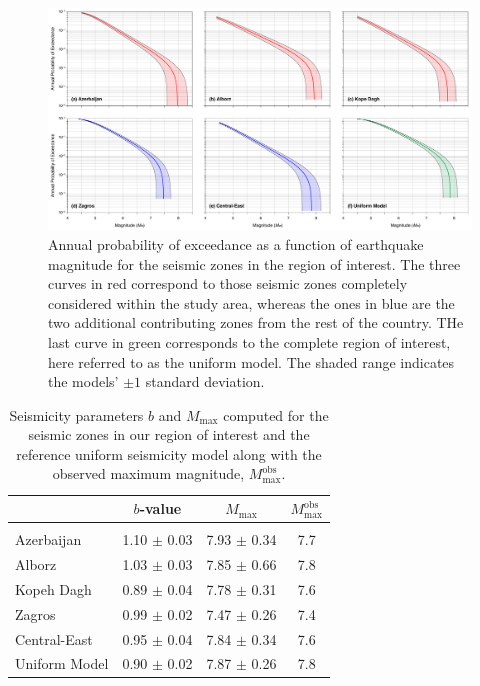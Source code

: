 
\begin{figure}[t]
    \centering
    \includegraphics[width=\textwidth]{figures/pdf/figure-06} 
    \caption{Annual probability of exceedance as a function of earthquake magnitude for the seismic zones in the region of interest. The three curves in red correspond to those seismic zones completely considered within the study area, whereas the ones in blue are the two additional contributing zones from the rest of the country. THe last curve in green corresponds to the complete region of interest, here referred to as the uniform model. The shaded range indicates the models' $\pm 1$ standard deviation.}
    \label{fig:annualp}
\end{figure}

\begin{table}[t]
    \centering
    \caption{Seismicity parameters $b$ and $M_{\max}$ computed for the seismic zones in our region of interest and the reference uniform seismicity model along with the observed maximum magnitude, $M_{\max}^{\mathrm{obs}}$.}
    \begin{tabular}{@{\hspace{0.2ex}}lccc@{\hspace{0.2ex}}}
        \cline{2-4}                                                                         \\[-1.6ex]
                        & $b$-value         & $M_{\max}$        & $M_{\max}^{\mathrm{obs}}$ \\[0.6ex]
        \hline                                                                              \\[-1.6ex]
        Azerbaijan      & 1.10 $\pm$ 0.03   & 7.93 $\pm$ 0.34   & 7.7                       \\
        Alborz          & 1.03 $\pm$ 0.03   & 7.85 $\pm$ 0.66   & 7.8                       \\
        Kopeh Dagh      & 0.89 $\pm$ 0.04   & 7.78 $\pm$ 0.31   & 7.6                       \\
        Zagros          & 0.99 $\pm$ 0.02   & 7.47 $\pm$ 0.26   & 7.4                       \\
        Central-East    & 0.95 $\pm$ 0.04   & 7.84 $\pm$ 0.34   & 7.6                       \\
        Uniform Model   & 0.90 $\pm$ 0.02   & 7.87 $\pm$ 0.26   & 7.8                       \\[0.5ex]
        \hline 
    \end{tabular}
    \label{tab:params} 
\end{table}

